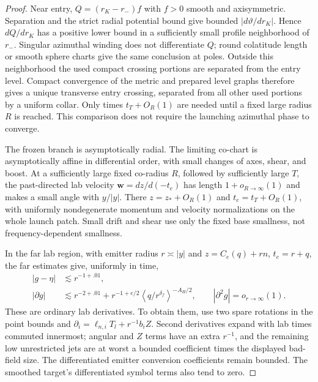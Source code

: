 \begin{proof}
Near entry, $Q=(r_K-r_-)f$ with $f>0$ smooth and axisymmetric.
Separation and the strict radial potential bound give bounded
$|d\vartheta/dr_K|$. Hence $dQ/dr_K$ has a positive lower bound
in a sufficiently small profile neighborhood of $r_-$. Singular
azimuthal winding does not differentiate $Q$; round colatitude
length or smooth sphere charts give the same conclusion at poles.
Outside this neighborhood the used compact crossing portions are
separated from the entry level. Compact convergence of the metric
and prepared level graphs therefore gives a unique transverse entry
crossing, separated from all other used portions by a uniform collar.
Only times $t_T+O_R(1)$ are needed until a fixed large radius $R$
is reached. This comparison does not require the launching azimuthal
phase to converge.

The frozen branch is asymptotically radial. The limiting co-chart
is asymptotically affine in differential order, with small changes
of axes, shear, and boost. At a sufficiently large fixed co-radius
$R$, followed by sufficiently large $T$, the past-directed lab
velocity $\mathbf w=dz/d(-t_e)$ has length
$1+o_{R\to\infty}(1)$ and makes a small angle with $y/|y|$.
There $z=z_*+O_R(1)$ and $t_e=t_T+O_R(1)$, with uniformly
nondegenerate momentum and velocity normalizations on the whole
launch patch. Small drift and shear use only the fixed base
smallness, not frequency-dependent smallness.

In the far lab region, with emitter radius $r\asymp|y|$ and
$z=C_e(q)+rn$, $t_e=r+q$, the far estimates give, uniformly in time,
\begin{equation}
 \begin{split}
 |g-\eta|&\lesssim r^{-1+.01},\\
 |\partial g|&\lesssim r^{-2+.01}
   +r^{-1+e/2}\left\langle q/r^{\delta_f}\right\rangle^{-A_H/2},
 \qquad |\partial^2g|=o_{r\to\infty}(1).
 \end{split}
 \label{pk2:far-ray-coefficients}
\end{equation}
These are ordinary lab derivatives. To obtain them, use two spare
rotations in the point bounds and
$\partial_i=\ell_{n,i}T_l+r^{-1}b_iZ$. Second derivatives expand
with lab times commuted innermost; angular and $Z$ terms have an
extra $r^{-1}$, and the remaining low unrestricted jets are at worst
a bounded coefficient times the displayed bad-field size. The
differentiated emitter conversion coefficients remain bounded.
The smoothed target's differentiated symbol terms also tend to zero.


\end{proof}
